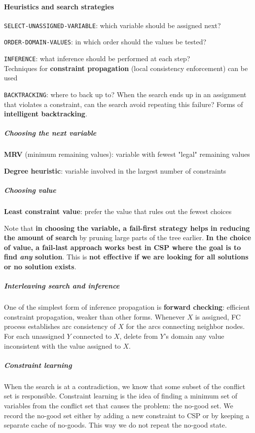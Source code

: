 \documentclass[10pt]{report}
\begin{document}
\paragraph{Heuristics and search strategies}
\begin{list}{}{}
	\item \texttt{SELECT-UNASSIGNED-VARIABLE}: which variable should be assigned next?
	\item \texttt{ORDER-DOMAIN-VALUES}: in which order should the values be tested?
	\item \texttt{INFERENCE}: what inference should be performed at each step?\\
	Techniques for \textbf{constraint propagation} (local consistency enforcement) can be used
	\item \texttt{BACKTRACKING}: where to back up to? When the search ends up in an assignment that violates a constraint, can the search avoid repeating this failure? Forms of \textbf{intelligent backtracking}.
\end{list}
\subparagraph{Choosing the next variable}\begin{list}{}{}
	\item \textbf{MRV} (minimum remaining values): variable with fewest "legal" remaining values
	\item \textbf{Degree heuristic}: variable involved in the largest number of constraints
\end{list}
\subparagraph{Choosing value} \begin{list}{}{}
	\item \textbf{Least constraint value}: prefer the value that rules out the fewest choices
\end{list}
Note that \textbf{in choosing the variable, a fail-first strategy helps in reducing the amount of search} by pruning large parts of the tree earlier. \textbf{In the choice of value, a fail-last approach works best in CSP where the goal is to find \textit{any} solution}. This is \textbf{not effective if we are looking for all solutions or no solution exists}.
\subparagraph{Interleaving search and inference} One of the simplest form of inference propagation is \textbf{forward checking}: efficient constraint propagation, weaker than other forms. Whenever $X$ is assigned, FC process establishes arc consistency of $X$ for the arcs connecting neighbor nodes. For each unassigned $Y$ connected to $X$, delete from $Y$'s domain any value inconsistent with the value assigned to $X$.
\subparagraph{Constraint learning} When the search is at a contradiction, we know that some subset of the conflict set is responsible. Constraint learning is the idea of finding a minimum set of variables from the conflict set that causes the problem: the no-good set. We record the no-good set either by adding a new constraint to CSP or by keeping a separate cache of no-goods. This way we do not repeat the no-good state.
\end{document}
